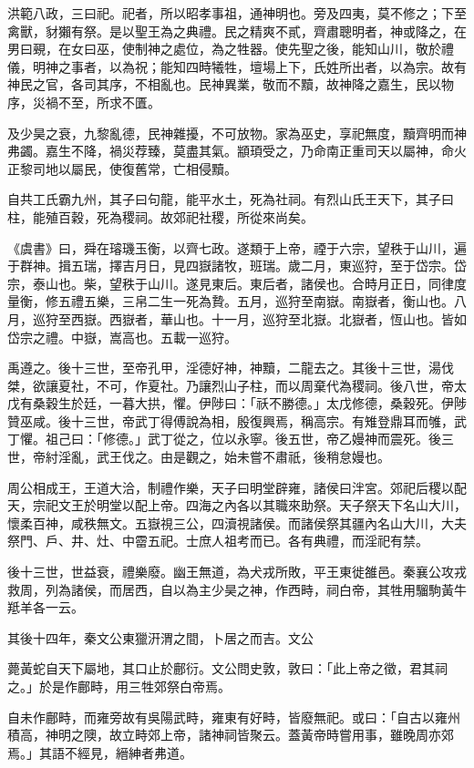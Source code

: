 
\begin{pinyinscope}
洪範八政，三曰祀。祀者，所以昭孝事祖，通神明也。旁及四夷，莫不修之；下至禽獸，豺獺有祭。是以聖王為之典禮。民之精爽不貳，齊肅聰明者，神或降之，在男曰覡，在女曰巫，使制神之處位，為之牲器。使先聖之後，能知山川，敬於禮儀，明神之事者，以為祝；能知四時犧牲，壇場上下，氏姓所出者，以為宗。故有神民之官，各司其序，不相亂也。民神異業，敬而不黷，故神降之嘉生，民以物序，災禍不至，所求不匱。

及少昊之衰，九黎亂德，民神雜擾，不可放物。家為巫史，享祀無度，黷齊明而神弗蠲。嘉生不降，禍災荐臻，莫盡其氣。顓頊受之，乃命南正重司天以屬神，命火正黎司地以屬民，使復舊常，亡相侵黷。

自共工氏霸九州，其子曰句龍，能平水土，死為社祠。有烈山氏王天下，其子曰柱，能殖百穀，死為稷祠。故郊祀社稷，所從來尚矣。

《虞書》曰，舜在璿璣玉衡，以齊七政。遂類于上帝，禋于六宗，望秩于山川，遍于群神。揖五瑞，擇吉月日，見四嶽諸牧，班瑞。歲二月，東巡狩，至于岱宗。岱宗，泰山也。柴，望秩于山川。遂見東后。東后者，諸侯也。合時月正日，同律度量衡，修五禮五樂，三帛二生一死為贄。五月，巡狩至南嶽。南嶽者，衡山也。八月，巡狩至西嶽。西嶽者，華山也。十一月，巡狩至北嶽。北嶽者，恆山也。皆如岱宗之禮。中嶽，嵩高也。五載一巡狩。

禹遵之。後十三世，至帝孔甲，淫德好神，神黷，二龍去之。其後十三世，湯伐桀，欲讓夏社，不可，作夏社。乃讓烈山子柱，而以周棄代為稷祠。後八世，帝太戊有桑穀生於廷，一暮大拱，懼。伊陟曰：「祅不勝德。」太戊修德，桑穀死。伊陟贊巫咸。後十三世，帝武丁得傅說為相，殷復興焉，稱高宗。有雉登鼎耳而雊，武丁懼。祖己曰：「修德。」武丁從之，位以永寧。後五世，帝乙嫚神而震死。後三世，帝紂淫亂，武王伐之。由是觀之，始未嘗不肅祇，後稍怠嫚也。

周公相成王，王道大洽，制禮作樂，天子曰明堂辟雍，諸侯曰泮宮。郊祀后稷以配天，宗祀文王於明堂以配上帝。四海之內各以其職來助祭。天子祭天下名山大川，懷柔百神，咸秩無文。五嶽視三公，四瀆視諸侯。而諸侯祭其疆內名山大川，大夫祭門、戶、井、灶、中霤五祀。士庶人祖考而已。各有典禮，而淫祀有禁。

後十三世，世益衰，禮樂廢。幽王無道，為犬戎所敗，平王東徙雒邑。秦襄公攻戎救周，列為諸侯，而居西，自以為主少昊之神，作西畤，祠白帝，其牲用騮駒黃牛羝羊各一云。

其後十四年，秦文公東獵汧渭之間，卜居之而吉。文公

薨黃蛇自天下屬地，其口止於鄜衍。文公問史敦，敦曰：「此上帝之徵，君其祠之。」於是作鄜畤，用三牲郊祭白帝焉。

自未作鄜畤，而雍旁故有吳陽武畤，雍東有好畤，皆廢無祀。或曰：「自古以雍州積高，神明之隩，故立畤郊上帝，諸神祠皆聚云。蓋黃帝時嘗用事，雖晚周亦郊焉。」其語不經見，縉紳者弗道。


\end{pinyinscope}
